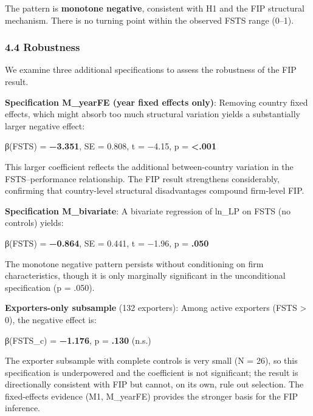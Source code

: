 \documentclass[
  12pt,a4paper]{article}
\begin{document}
The pattern is \textbf{monotone negative}, consistent with H1 and the
FIP structural mechanism. There is no turning point within the observed
FSTS range (0--1).

\hypertarget{robustness}{%
\subsubsection{4.4 Robustness}\label{robustness}}

We examine three additional specifications to assess the robustness of
the FIP result.

\textbf{Specification M\_yearFE (year fixed effects only)}: Removing
country fixed effects, which might absorb too much structural variation
yields a substantially larger negative effect:

β(FSTS) = \textbf{−3.351}, SE = 0.808, t = −4.15, p =
\textbf{\textless.001}

This larger coefficient reflects the additional between-country
variation in the FSTS--performance relationship. The FIP result
strengthens considerably, confirming that country-level structural
disadvantages compound firm-level FIP.

\textbf{Specification M\_bivariate}: A bivariate regression of ln\_LP on
FSTS (no controls) yields:

β(FSTS) = \textbf{−0.864}, SE = 0.441, t = −1.96, p = \textbf{.050}

The monotone negative pattern persists without conditioning on firm
characteristics, though it is only marginally significant in the
unconditional specification (p = .050).

\textbf{Exporters-only subsample} (132 exporters): Among active
exporters (FSTS \textgreater{} 0), the negative effect is:

β(FSTS\_c) = \textbf{−1.176}, p = \textbf{.130} (n.s.)

The exporter subsample with complete controls is very small (N = 26), so
this specification is underpowered and the coefficient is not
significant; the result is directionally consistent with FIP but cannot,
on its own, rule out selection. The fixed-effects evidence (M1,
M\_yearFE) provides the stronger basis for the FIP inference.
\end{document}
